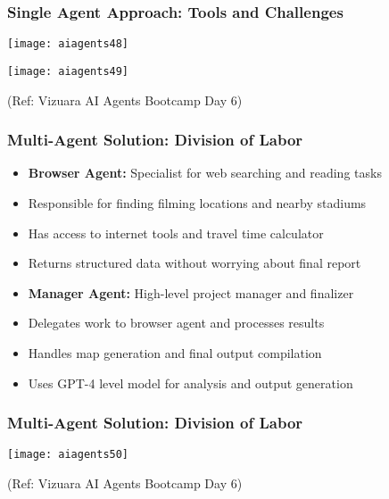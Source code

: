 \begin{frame}[fragile]\frametitle{Single Agent Approach: Tools and Challenges}


		\begin{center}
		\texttt{[image: aiagents48]}
		
		\texttt{[image: aiagents49]}
		
		{\tiny (Ref: Vizuara AI Agents Bootcamp Day 6)}
		\end{center}	

\end{frame}


\begin{frame}[fragile]\frametitle{Multi-Agent Solution: Division of Labor}

      \begin{itemize}
		\item \textbf{Browser Agent:} Specialist for web searching and reading tasks
		\item Responsible for finding filming locations and nearby stadiums
		\item Has access to internet tools and travel time calculator
		\item Returns structured data without worrying about final report
		\item \textbf{Manager Agent:} High-level project manager and finalizer
		\item Delegates work to browser agent and processes results
		\item Handles map generation and final output compilation
		\item Uses GPT-4 level model for analysis and output generation
	  \end{itemize}

\end{frame}

\begin{frame}[fragile]\frametitle{Multi-Agent Solution: Division of Labor}

		\begin{center}
		\texttt{[image: aiagents50]}
		
		{\tiny (Ref: Vizuara AI Agents Bootcamp Day 6)}
		\end{center}	

\end{frame}


